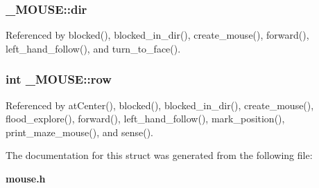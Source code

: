 \subsubsection[{dir}]{ \-\_\-\-M\-O\-U\-S\-E\-::dir}\label{struct__MOUSE_a53f0244726c310c83c8fc413757252ff}


Referenced by blocked(), blocked\-\_\-in\-\_\-dir(), create\-\_\-mouse(), forward(), left\-\_\-hand\-\_\-follow(), and turn\-\_\-to\-\_\-face().

\subsubsection[{row}]{\setlength{\rightskip}{0pt plus 5cm}int \-\_\-\-M\-O\-U\-S\-E\-::row}\label{struct__MOUSE_aae94539440c5448fbda17b54fd6119ac}


Referenced by at\-Center(), blocked(), blocked\-\_\-in\-\_\-dir(), create\-\_\-mouse(), flood\-\_\-explore(), forward(), left\-\_\-hand\-\_\-follow(), mark\-\_\-position(), print\-\_\-maze\-\_\-mouse(), and sense().



The documentation for this struct was generated from the following file\-:\begin{DoxyCompactItemize}
\item 
{\bf mouse.\-h}\end{DoxyCompactItemize}
